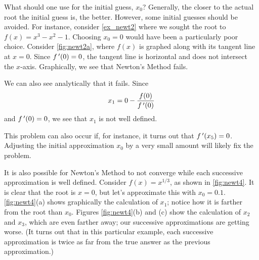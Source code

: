 What should one use for the initial guess, $x_0$?  Generally, the closer to the actual root the initial guess is, the better.  However, some initial guesses should be avoided.  For instance, consider \autoref{ex_newt2} where we sought the root to $f(x) = x^3-x^2-1$.  Choosing  $x_0=0$ would have been a particularly poor choice. Consider \autoref{fig:newt2a}, where $f(x)$ is graphed along with its tangent line at $x=0$. Since $f\,'(0)=0$, the tangent line is horizontal and does not intersect the $x$-axis. Graphically, we see that Newton's Method fails.

We can also see analytically that it fails. Since
\[x_1 = 0 -\frac{f(0)}{f\,'(0)}\]
and $f\,'(0)=0$, we see that $x_1$ is not well defined.  

This problem can also occur if, for instance, it turns out that $f\,'(x_5)=0$. Adjusting the initial approximation $x_0$ by a very small amount will likely fix the problem.

It is also possible for Newton's Method to not converge while each successive approximation is well defined. Consider $f(x) = x^{1/3}$, as shown in \autoref{fig:newt4}. It is clear that the root is $x=0$, but let's approximate this with $x_0=0.1$. \autoref{fig:newt4}(a) shows graphically the calculation of $x_1$; notice how it is farther from the root than $x_0$. Figures \ref{fig:newt4}(b) and (c) show the calculation of $x_2$ and $x_3$, which are even farther away; our successive approximations are getting worse. (It turns out that in this particular example, each successive approximation is twice as far from the true answer as the previous approximation.)

